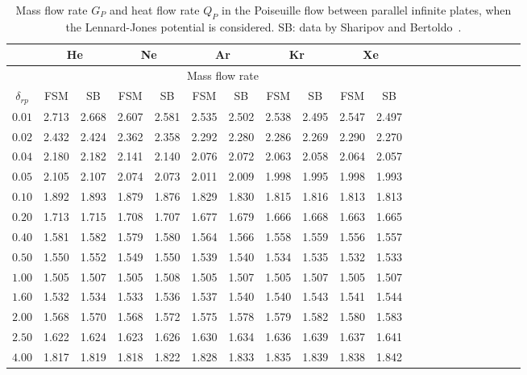 \begin{table}[pt]
	\caption{Mass flow rate $G_P$ and heat flow rate $Q_P$ in the Poiseuille flow between parallel infinite plates, when the Lennard-Jones potential is considered. SB: data by Sharipov and Bertoldo~\cite{Sharipov2009}.   }
	\centering
	\begin{tabular}{ccccccccccccccccccccc}
		\hline 
		& \multicolumn{2}{c}{He}
		& \multicolumn{2}{c}{Ne}  
		& \multicolumn{2}{c}{Ar} 
		& \multicolumn{2}{c}{Kr}  
		& \multicolumn{2}{c}{Xe} \\ 
		\hline 
		&  \multicolumn{10}{c}{Mass flow rate}    \\
		$\delta_{rp}$ & FSM  &  SB  &  FSM &  SB  & FSM  &  SB  &  FSM &  SB  & FSM  &  SB   \\ \hline 
		$0.01$ & 2.713& 2.668& 2.607& 2.581& 2.535& 2.502& 2.538& 2.495& 2.547& 2.497  \\
		$0.02$ & 2.432& 2.424& 2.362& 2.358& 2.292& 2.280& 2.286& 2.269& 2.290& 2.270  \\
		$0.04$ & 2.180& 2.182& 2.141& 2.140& 2.076& 2.072& 2.063& 2.058& 2.064& 2.057  \\
		$0.05$ & 2.105& 2.107& 2.074& 2.073& 2.011& 2.009& 1.998& 1.995& 1.998& 1.993  \\
		$0.10$ & 1.892& 1.893& 1.879& 1.876& 1.829& 1.830& 1.815& 1.816& 1.813& 1.813  \\
		$0.20$ & 1.713& 1.715& 1.708& 1.707& 1.677& 1.679& 1.666& 1.668& 1.663& 1.665  \\
		$0.40$ & 1.581& 1.582& 1.579& 1.580& 1.564& 1.566& 1.558& 1.559& 1.556& 1.557  \\
		$0.50$ & 1.550& 1.552& 1.549& 1.550& 1.539& 1.540& 1.534& 1.535& 1.532& 1.533  \\
		$1.00$ & 1.505& 1.507& 1.505& 1.508& 1.505& 1.507& 1.505& 1.507& 1.505& 1.507  \\
		$1.60$ & 1.532& 1.534& 1.533& 1.536& 1.537& 1.540& 1.540& 1.543& 1.541& 1.544  \\
		$2.00$ & 1.568& 1.570& 1.568& 1.572& 1.575& 1.578& 1.579& 1.582& 1.580& 1.583  \\
		$2.50$ & 1.622& 1.624& 1.623& 1.626& 1.630& 1.634& 1.636& 1.639& 1.637& 1.641  \\
		$4.00$ & 1.817& 1.819& 1.818& 1.822& 1.828& 1.833& 1.835& 1.839& 1.838& 1.842  \\

\end{tabular}
\end{table}
